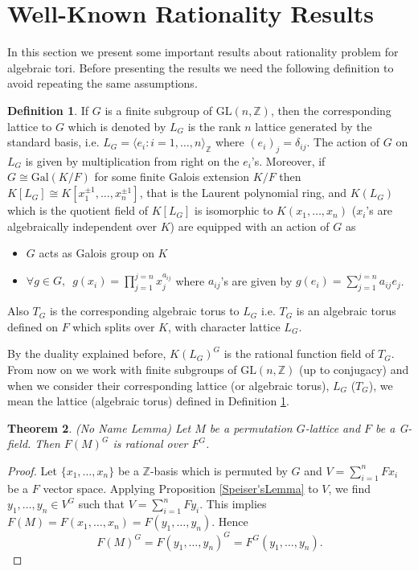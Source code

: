\documentclass{article}
\theoremstyle{plain}
\newtheorem{theorem}{Theorem}
\theoremstyle{definition}
\newtheorem{definition}[theorem]{Definition}
\newcommand{\Z}{\ensuremath{\mathbb{Z}}}
\newcommand{\G}{G}
\newcommand{\glat}{$G$-lattice}
\begin{document}
\section{Well-Known Rationality Results}
In this section we present some important results about rationality problem for 
algebraic tori. Before presenting the results we need the following definition 
to avoid repeating the same assumptions.
\begin{definition}\label{Assumption}
If $G$ is a finite subgroup of $\mathrm{GL}(n,\Z)$, then the corresponding lattice 
to $G$ which is denoted by $L_G$ is the rank $n$ lattice generated by the standard 
basis, i.e. $L_G = \langle e_i : i  = 1, \ldots, n \rangle_\Z$ where $(e_i)_j = \delta_{ij}$. 
The action of $G$ on $L_G$ is given by multiplication from right on the $e_i$'s.
 Moreover, if $G \cong \mathrm{Gal}(K/F)$ for some finite Galois extension $K/F$ 
 then $K[L_G] \cong K[x^{\pm 1}_1, \ldots , x^{\pm 1}_n]$, that is the Laurent 
 polynomial ring, and $K(L_G)$ which is the quotient field of $K[L_G]$ is isomorphic 
 to $K(x_1, \ldots , x_n)$ ($x_i$'s are algebraically independent over $K$) are equipped 
 with an action of $G$ as
\begin{itemize}
\item $G$ acts as Galois group on $K$ 
\item $\forall g \in G, \,\,\, g(x_i) = \prod_{j=1}^{j=n} x_j^{a_{ij}}$  where $a_{ij}$'s 
are given by $g(e_i) = \sum_{j=1}^{j=n} a_{ij}e_j$.
\end{itemize}
Also $T_G$ is the corresponding algebraic torus to $L_G$ i.e. $T_G$ is an algebraic 
torus defined on $F$ which splits over $K$, with character lattice $L_G$. 
\end{definition}
\noindent
By the duality explained before, $K(L_G)^G$ is the rational function field of $T_G$. 
From now on we work with finite subgroups of $\mathrm{GL}(n,\Z)$ (up to conjugacy) and 
when we consider their corresponding lattice (or algebraic torus), $L_G$ ($T_G$), we 
mean the lattice (algebraic torus) defined in Definition \ref{Assumption}. 
\label{action}
\begin{theorem}\cite{Speiser}\label{NoNameLemma}
(No Name Lemma) Let $M$ be a permutation \glat \,\,and $F$ be a \G-field. Then $F(M)^\G$ 
is rational over $F^\G$. 
\end{theorem}
\begin{proof}
Let $\lbrace x_1, \ldots , x_n \rbrace$ be a $\Z$-basis which is permuted by $G$ and 
$V = \sum^n_{i=1}Fx_i$ be a $F$ vector space. Applying Proposition \ref{Speiser'sLemma} 
to $V$, we find $y_1, \ldots , y_n \in V^G $ such that $V = \sum^n_{i=1}Fy_i$. This 
implies $F(M) = F(x_1, \ldots, x_n) = F(y_1, \ldots, y_n)$. Hence 
$$F(M)^G = F(y_1, \ldots , y_n)^G = F^G(y_1, \dots, y_n).$$ 
\end{proof}
\end{document}
